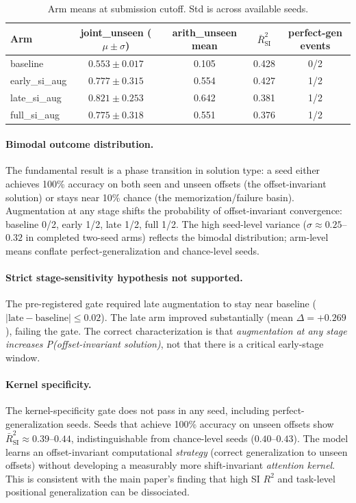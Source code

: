 \documentclass{article}
\begin{document}
\begin{table}[htbp]
\centering
\small
\caption{Arm means at submission cutoff. Std is across available seeds.}
\label{tab:e23_arm_means}
\begin{tabular}{lcccc}
\toprule
Arm & joint\_unseen ($\mu \pm \sigma$) & arith\_unseen mean & $\bar{R}^2_{\mathrm{SI}}$ & perfect-gen events \\
\midrule
baseline      & $0.553 \pm 0.017$ & 0.105 & 0.428 & 0/2 \\
early\_si\_aug & $0.777 \pm 0.315$ & 0.554 & 0.427 & 1/2 \\
late\_si\_aug  & $0.821 \pm 0.253$ & 0.642 & 0.381 & 1/2 \\
full\_si\_aug  & $0.775 \pm 0.318$ & 0.551 & 0.376 & 1/2 \\
\bottomrule
\end{tabular}
\end{table}

\paragraph{Bimodal outcome distribution.} The fundamental result is a phase transition in solution type: a seed either achieves 100\% accuracy on both seen and unseen offsets (the offset-invariant solution) or stays near 10\% chance (the memorization/failure basin). Augmentation at any stage shifts the probability of offset-invariant convergence: baseline 0/2, early 1/2, late 1/2, full 1/2. The high seed-level variance ($\sigma \approx 0.25$--$0.32$ in completed two-seed arms) reflects the bimodal distribution; arm-level means conflate perfect-generalization and chance-level seeds.

\paragraph{Strict stage-sensitivity hypothesis not supported.} The pre-registered gate required late augmentation to stay near baseline ($|\text{late} - \text{baseline}| \leq 0.02$). The late arm improved substantially (mean $\Delta = +0.269$), failing the gate. The correct characterization is that \textit{augmentation at any stage increases P(offset-invariant solution)}, not that there is a critical early-stage window.

\paragraph{Kernel specificity.} The kernel-specificity gate does not pass in any seed, including perfect-generalization seeds. Seeds that achieve 100\% accuracy on unseen offsets show $\bar{R}^2_{\mathrm{SI}} \approx 0.39$--$0.44$, indistinguishable from chance-level seeds ($0.40$--$0.43$). The model learns an offset-invariant computational \textit{strategy} (correct generalization to unseen offsets) without developing a measurably more shift-invariant \textit{attention kernel}. This is consistent with the main paper's finding that high SI $R^2$ and task-level positional generalization can be dissociated.
\end{document}
